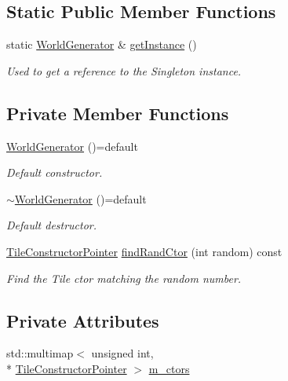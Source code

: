 \subsection*{Static Public Member Functions}
\begin{DoxyCompactItemize}
\item 
static \hyperlink{classCourse_1_1WorldGenerator}{World\-Generator} \& \hyperlink{classCourse_1_1WorldGenerator_a2b94f9ec5aa516b6528d90fa81868900}{get\-Instance} ()
\begin{DoxyCompactList}\small\item\em Used to get a reference to the Singleton instance. \end{DoxyCompactList}\end{DoxyCompactItemize}
\subsection*{Private Member Functions}
\begin{DoxyCompactItemize}
\item 
\hyperlink{classCourse_1_1WorldGenerator_a5f75bf6c9132d395a4ab0e5e68d1c599}{World\-Generator} ()=default
\begin{DoxyCompactList}\small\item\em Default constructor. \end{DoxyCompactList}\item 
\hyperlink{classCourse_1_1WorldGenerator_ae1cdc6937568b2a48b82040f4729e7a9}{$\sim$\-World\-Generator} ()=default
\begin{DoxyCompactList}\small\item\em Default destructor. \end{DoxyCompactList}\item 
\hyperlink{namespaceCourse_acf802ffd79a9573eb8afca22ae1f8a2f}{Tile\-Constructor\-Pointer} \hyperlink{classCourse_1_1WorldGenerator_a252f641fc41a3d89b86095f279d7a5fe}{find\-Rand\-Ctor} (int random) const 
\begin{DoxyCompactList}\small\item\em Find the Tile ctor matching the random number. \end{DoxyCompactList}\end{DoxyCompactItemize}
\subsection*{Private Attributes}
\begin{DoxyCompactItemize}
\item 
std\-::multimap$<$ unsigned int, \\*
\hyperlink{namespaceCourse_acf802ffd79a9573eb8afca22ae1f8a2f}{Tile\-Constructor\-Pointer} $>$ \hyperlink{classCourse_1_1WorldGenerator_aa4b7964b0d107de1248bb1cf0abb306a}{m\-\_\-ctors}
\end{DoxyCompactItemize}


